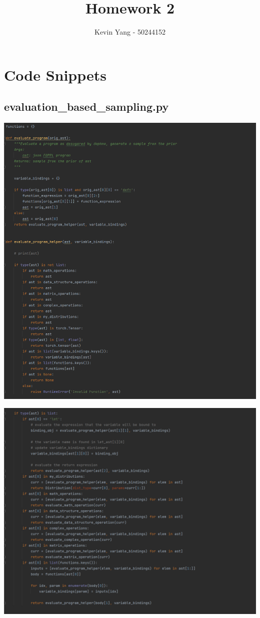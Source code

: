 \documentclass[10pt]{homeworg}
\title{Homework 2}
\author{Kevin Yang - 50244152}
\begin{document}
\maketitle

\section{Code Snippets}
\subsection{evaluation\_based\_sampling.py}

\begin{center}
\includegraphics[scale=0.5]{figures/evaluate_program_1.png}
\end{center}

\begin{center}
\includegraphics[scale=0.5]{figures/evaluate_program_2.png}
\end{center}
\end{document}
